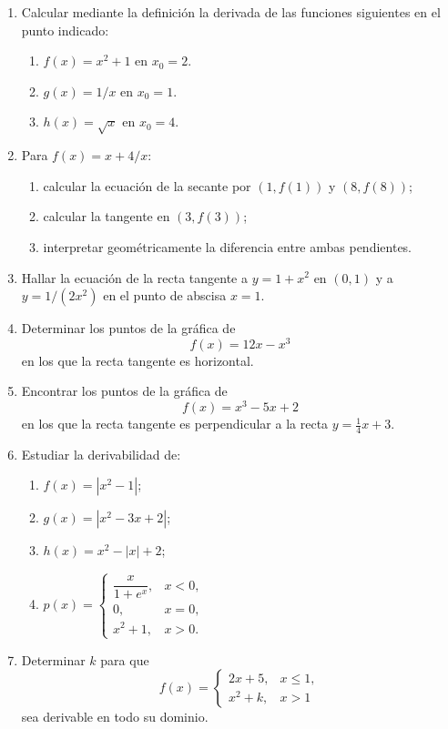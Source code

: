 \begin{enumerate}[label=\textbf{\arabic*.},leftmargin=*]

\item Calcular mediante la definición la derivada de las funciones siguientes en el punto indicado:
\begin{enumerate}[label=\alph*)]
\item $f(x)=x^2+1$ en $x_0=2$.
\item $g(x)=1/x$ en $x_0=1$.
\item $h(x)=\sqrt{x}$ en $x_0=4$.
\end{enumerate}

\item Para $f(x)=x+4/x$:
\begin{enumerate}[label=\alph*)]
\item calcular la ecuación de la secante por $(1,f(1))$ y $(8,f(8))$;
\item calcular la tangente en $(3,f(3))$;
\item interpretar geométricamente la diferencia entre ambas pendientes.
\end{enumerate}

\item Hallar la ecuación de la recta tangente a $y=1+x^2$ en $(0,1)$ y a $y=1/(2x^2)$ en el punto de abscisa $x=1$.

\item Determinar los puntos de la gráfica de
\[
f(x)=12x-x^3
\]
en los que la recta tangente es horizontal.

\item Encontrar los puntos de la gráfica de
\[
f(x)=x^3-5x+2
\]
en los que la recta tangente es perpendicular a la recta $y=\frac14x+3$.

\item Estudiar la derivabilidad de:
\begin{enumerate}[label=\alph*)]
\item $f(x)=|x^2-1|$;
\item $g(x)=|x^2-3x+2|$;
\item $h(x)=x^2-|x|+2$;
\item $p(x)=\begin{cases}\dfrac{x}{1+e^x},&x<0,\\0,&x=0,\\x^2+1,&x>0.\end{cases}$
\end{enumerate}

\item Determinar $k$ para que
\[
f(x)=
\begin{cases}
2x+5,&x\leq1,\\
x^2+k,&x>1
\end{cases}
\]
sea derivable en todo su dominio.


\end{enumerate}
